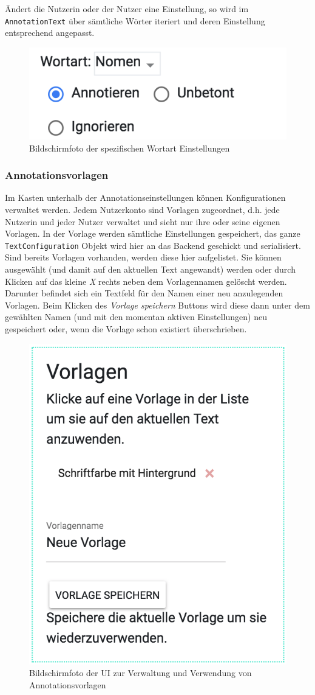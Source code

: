 Ändert die Nutzerin oder der Nutzer eine Einstellung, so wird im \texttt{AnnotationText} über sämtliche Wörter iteriert und deren Einstellung entsprechend angepasst.

\begin{figure}[h!]
	\centering
	\includegraphics[width=.4\linewidth, frame]{figures/frontend/config-pos}
	\caption{Bildschirmfoto der spezifischen Wortart Einstellungen}
	\label{fig:frontend-pos-einstellungen}
\end{figure}

\subsubsection{Annotationsvorlagen}

Im Kasten unterhalb der Annotationseinstellungen können Konfigurationen verwaltet werden. Jedem Nutzerkonto sind Vorlagen zugeordnet, d.h. jede Nutzerin und jeder Nutzer verwaltet und sieht nur ihre oder seine eigenen Vorlagen. In der Vorlage werden sämtliche Einstellungen gespeichert, das ganze \texttt{TextConfiguration} Objekt wird hier an das Backend geschickt und serialisiert.\\

Sind bereits Vorlagen vorhanden, werden diese hier aufgelistet. Sie können ausgewählt (und damit auf den aktuellen Text angewandt) werden oder durch Klicken auf das kleine \textit{X} rechts neben dem Vorlagennamen gelöscht werden. Darunter befindet sich ein Textfeld für den Namen einer neu anzulegenden Vorlagen. Beim Klicken des \textit{Vorlage speichern} Buttons wird diese dann unter dem gewählten Namen (und mit den momentan aktiven Einstellungen) neu gespeichert oder, wenn die Vorlage schon existiert überschrieben.

\begin{figure}[h!]
	\centering
	\includegraphics[width=.4\linewidth]{figures/frontend/config-vorlagen}
	\caption{Bildschirmfoto der UI zur Verwaltung und Verwendung von Annotationsvorlagen}
	\label{fig:frontend-vorlagen}
\end{figure}

